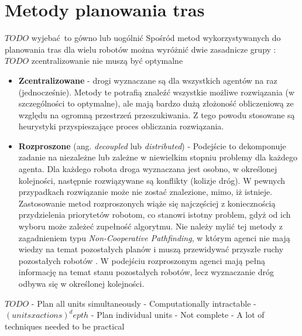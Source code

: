 \section{Metody planowania tras}
$TODO$ wyjebać to gówno lub uogólnić
Spośród metod wykorzystywanych do planowania tras dla wielu robotów można wyróżnić dwie zasadnicze grupy \cite{latombe}:
$TODO$ zcentralizowanie nie muszą być optymalne
\begin{itemize}
	\item {\bf Zcentralizowane} - drogi wyznaczane są dla wszystkich agentów na raz (jednocześnie). Metody te potrafią znaleźć wszystkie możliwe rozwiązania (w szczególności to optymalne), ale mają bardzo dużą złożoność obliczeniową ze względu na ogromną przestrzeń przeszukiwania. Z tego powodu stosowane są heurystyki przyspieszające proces obliczania rozwiązania.
	\item {\bf Rozproszone} (ang. {\it decoupled} lub {\it distributed}) - Podejście to dekomponuje zadanie na niezależne lub zależne w niewielkim stopniu problemy dla każdego agenta. Dla każdego robota droga wyznaczana jest osobno, w określonej kolejności, następnie rozwiązywane są konflikty (kolizje dróg). W pewnych przypadkach rozwiązanie może nie zostać znalezione, mimo, iż istnieje. Zastosowanie metod rozproszonych wiąże się najczęściej z koniecznością przydzielenia priorytetów robotom, co stanowi istotny problem, gdyż od ich wyboru może zależeć zupełność algorytmu. Nie należy mylić tej metody z zagadnieniem typu {\it Non-Cooperative Pathfinding}, w którym agenci nie mają wiedzy na temat pozostałych planów i muszą przewidywać przyszłe ruchy pozostałych robotów \cite{cooppath}. W podejściu rozproszonym agenci mają pełną informację na temat stanu pozostałych robotów, lecz wyznaczanie dróg odbywa się w określonej kolejności.
\end{itemize}

$TODO$
- Plan all units simultaneously
	- Computationally intractable
	- $(units x actions)^depth$
- Plan individual units
	- Not complete
	- A lot of techniques needed to be practical

